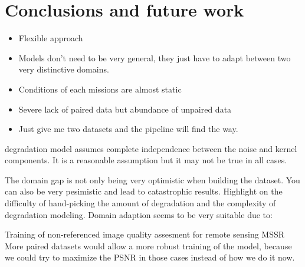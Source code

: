 \section{Conclusions and future work}

\begin{itemize}
    \item Flexible approach
    \item Models don't need to be very general, they just have to adapt between two very distinctive domains.
    \item Conditions of each missions are almost static
    \item Severe lack of paired data but abundance of unpaired data
    \item Just give me two datasets and the pipeline will find the way.
\end{itemize}


degradation model assumes complete independence between the noise and kernel components.
It is a reasonable assumption but it may not be true in all cases.

The domain gap is not only being very optimistic when building the dataset. 
You can also be very pesimistic and lead to catastrophic results.
Highlight on the difficulty of hand-picking the amount of degradation and the complexity of degradation modeling.
Domain adaption seems to be very suitable due to: 




Training of non-referenced image quality assesment for remote sensing
MSSR
More paired datasets would allow a more robust training of the model, because we could try to maximize the PSNR in those cases instead of how we do it now.
